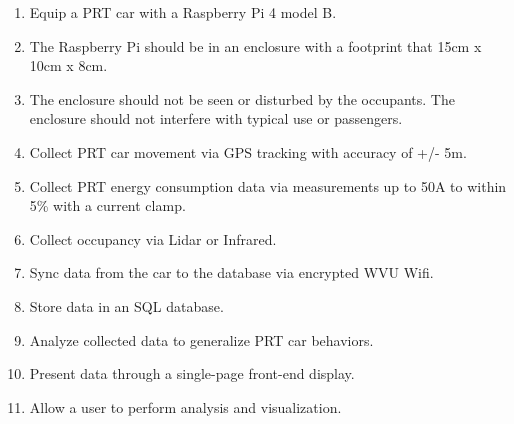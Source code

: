 \begin{enumerate}
    \item Equip a PRT car with a Raspberry Pi 4 model B. 
    \item The Raspberry Pi should be in an enclosure with a footprint that 15cm x 10cm x 8cm.
    \item The enclosure should not be seen or disturbed by the occupants. The enclosure should not interfere with typical use or passengers.
    \item Collect PRT car movement via GPS tracking with accuracy of +/- 5m.
    \item Collect PRT energy consumption data via measurements up to 50A to within 5\% with a current clamp.
    \item Collect occupancy via Lidar or Infrared. 
    \item Sync data from the car to the database via encrypted WVU Wifi. 
    \item Store data in an SQL database.
    \item Analyze collected data to generalize PRT car behaviors. 
    \item Present data through a single-page front-end display.
    \item Allow a user to perform analysis and visualization.
\end{enumerate}